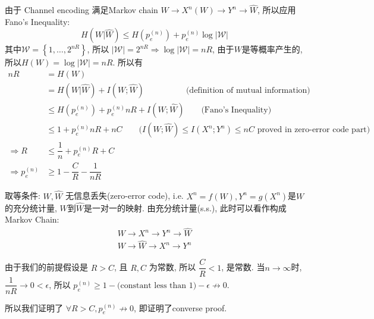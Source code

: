 由于 Channel encoding 满足Markov chain $W\to X^n(W)\to Y^n\to \hat{W}$, 所以应用Fano's Inequality:
$$H(W|\hat{W})\leq H(p_e^{(n)})+p_e^{(n)}\log\left|\mathcal{W}\right|$$
其中$\mathcal{W}=\left\{1,\ldots,2^{nR}\right\}$, 所以 $\left|\mathcal{W}\right|=2^{nR}\Rightarrow \log\left|\mathcal{W}\right|=nR$, 由于$W$是等概率产生的, 所以$H(W)= \log\left|\mathcal{W}\right| = nR$. 所以有
\begin{align*}
nR &= H(W) \\
&= H(W|\hat{W}) + I(W;\hat{W}) \qquad\qquad\quad \text{(definition of mutual information)} \\
&\leq H(p_e^{(n)})+p_e^{(n)} nR + I(W;\hat{W}) \qquad \text{(Fano's Inequality)} \\
&\leq 1 + p_e^{(n)}nR + nC \qquad \text{($I(W;\hat{W})\leq I(X^n;Y^n)\leq nC$ proved in zero-error code part)} \\
\Rightarrow R &\leq \dfrac{1}{n} + p_e^{(n)}R + C \\
\Rightarrow p_e^{(n)} &\geq 1 - \dfrac{C}{R} - \dfrac{1}{nR}
\end{align*}

取等条件: $W,\hat{W}$ 无信息丢失(zero-error code), i.e. $X^n=f(W), Y^n=g(X^n)$是$W$的充分统计量, $W$到$\hat{W}$是一对一的映射. 由充分统计量(s.s.), 此时可以看作构成 Markov Chain:
\begin{align*}
W \to X^n \to Y^n \to \hat{W} \\
W \to \hat{W} \to X^n \to Y^n
\end{align*}

由于我们的前提假设是 $R>C$, 且 $R,C$ 为常数, 所以 $\dfrac{C}{R}<1$, 是常数. 当$n\to\infty$时, $\dfrac{1}{nR}\to 0<\epsilon$, 所以 $p_e^{(n)}\geq 1-\text{(constant less than $1$)} - \epsilon \not\to 0$.

所以我们证明了 $\forall R>C, p_e^{(n)}\not\to 0$, 即证明了converse proof.